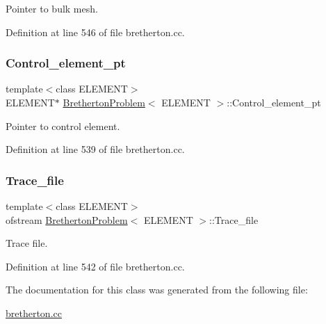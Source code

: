 Pointer to bulk mesh. 



Definition at line 546 of file bretherton.\+cc.

\mbox{\label{classBrethertonProblem_ab1dfeabf599487ac4a121398c6a98368}} 
\subsubsection{\texorpdfstring{Control\+\_\+element\+\_\+pt}{Control\_element\_pt}}
{\footnotesize\ttfamily template$<$class E\+L\+E\+M\+E\+NT$>$ \\
E\+L\+E\+M\+E\+NT$\ast$ \hyperlink{classBrethertonProblem}{Bretherton\+Problem}$<$ E\+L\+E\+M\+E\+NT $>$\+::Control\+\_\+element\+\_\+pt\hspace{0.3cm}{\ttfamily [private]}}



Pointer to control element. 



Definition at line 539 of file bretherton.\+cc.

\mbox{\label{classBrethertonProblem_ae37c09c1e0faf5ba8b347fab6a9f687f}} 
\subsubsection{\texorpdfstring{Trace\+\_\+file}{Trace\_file}}
{\footnotesize\ttfamily template$<$class E\+L\+E\+M\+E\+NT$>$ \\
ofstream \hyperlink{classBrethertonProblem}{Bretherton\+Problem}$<$ E\+L\+E\+M\+E\+NT $>$\+::Trace\+\_\+file\hspace{0.3cm}{\ttfamily [private]}}



Trace file. 



Definition at line 542 of file bretherton.\+cc.



The documentation for this class was generated from the following file\+:\begin{DoxyCompactItemize}
\item 
\hyperlink{bretherton_8cc}{bretherton.\+cc}\end{DoxyCompactItemize}
